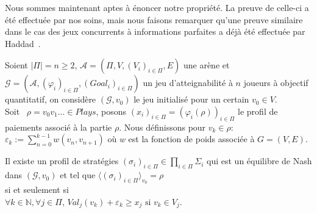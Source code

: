 Nous sommes maintenant aptes à énoncer notre propriété. La preuve de celle-ci a été effectuée par nos soins, mais nous faisons remarquer qu'une preuve similaire dans le cas des jeux concurrents à informations parfaites a déjà été effectuée par Haddad~\cite{characNashEq}. 

\begin{propriete}
	\label{prop:rechEqpert1}
	Soient $|\Pi| = n \geq 2$, $\mathcal{A} = (\Pi, V, (V_{i})_{i\in\Pi}, E)$ une arène et $\mathcal{G} = (\mathcal{A}, (\varphi _{i})_{i\in\Pi}, (Goal_{i})_{i\in\Pi})$ un jeu d'atteignabilité à $n$ joueurs à objectif quantitatif, on considère $(\mathcal{G}, v_{0})$ le jeu initialisé pour un certain $v_{0} \in V $.\\ Soit \ $\rho = v_{0}v_{1}... \in Plays$, posons $(x_{i})_{i\in\Pi} = (\varphi _{i}(\rho))_{i\in\Pi}$ le profil de paiements associé à la partie $\rho$. Nous définissons pour $v_{k} \in \rho$: $\varepsilon _{k} := \sum _{n= 0} ^{k-1} w(v_{n},v_{n+1})$ où $w$ est la fonction de poids associée à $G = (V,E)$.
	
	\begin{center}Il existe un  profil de stratégies $ (\sigma _{i})_{i\in\Pi} \in \prod_{i\in\Pi} \Sigma _{i}$ qui est un équilibre de Nash dans $(\mathcal{G},v_{0})$ et tel que $\langle (\sigma _{i})_{i \in \Pi}\rangle_{v_0} = \rho$\\ $\text{}$\\ si et seulement si\\$\text{}$\\  $ \forall k \in \mathbb{N}, \forall j \in \Pi$, $Val_{j}(v_{k}) + \varepsilon _{k} \geq x_j \text{  si } v_{k} \in V_{j}$.\end{center}
	
\end{propriete}

\setcounter{equation}{0}


